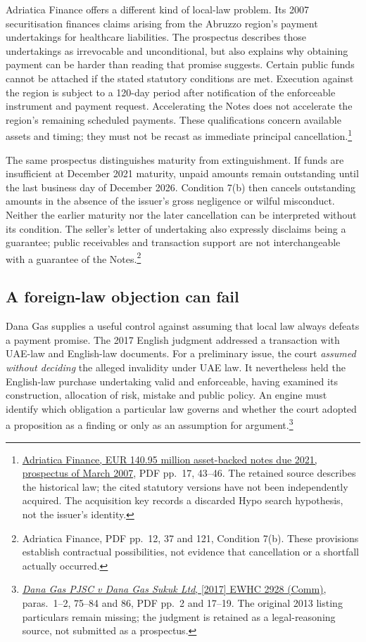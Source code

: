 Adriatica Finance offers a different kind of local-law problem. Its 2007
securitisation finances claims arising from the Abruzzo region's payment
undertakings for healthcare liabilities. The prospectus describes those
undertakings as irrevocable and unconditional, but also explains why
obtaining payment can be harder than reading that promise suggests.
Certain public funds cannot be attached if the stated statutory conditions
are met. Execution against the region is subject to a 120-day period after
notification of the enforceable instrument and payment request.
Accelerating the Notes does not accelerate the region's remaining scheduled
payments. These qualifications concern available assets and timing; they
must not be recast as immediate principal cancellation.\footnote{
\href{../prospectus/corner-cases-2026-10-04/sources/jur-more-hypo-843665/source.pdf}
{Adriatica Finance, EUR 140.95 million asset-backed notes due 2021,
prospectus of March 2007}, PDF pp.~17, 43--46.
The retained source describes the historical law; the cited statutory
versions have not been independently acquired. The acquisition key records
a discarded Hypo search hypothesis, not the issuer's identity.}

The same prospectus distinguishes maturity from extinguishment. If funds
are insufficient at December 2021 maturity, unpaid amounts remain outstanding
until the last business day of December 2026. Condition 7(b) then cancels
outstanding amounts in the absence of the issuer's gross negligence or
wilful misconduct. Neither the earlier maturity nor the later cancellation
can be interpreted without its condition. The seller's letter of undertaking
also expressly disclaims being a guarantee; public receivables and transaction
support are not interchangeable with a guarantee of the Notes.\footnote{
Adriatica Finance, PDF pp.~12, 37 and 121, Condition 7(b). These provisions
establish contractual possibilities, not evidence that cancellation or a
shortfall actually occurred.}

\subsection{A foreign-law objection can fail}

Dana Gas supplies a useful control against assuming that local law always
defeats a payment promise. The 2017 English judgment addressed a transaction
with UAE-law and English-law documents. For a preliminary issue, the court
\emph{assumed without deciding} the alleged invalidity under UAE law.
It nevertheless held the English-law purchase undertaking valid and
enforceable, having examined its construction, allocation of risk, mistake
and public policy. An engine must identify which obligation a particular law
governs and whether the court adopted a proposition as a finding or only
as an assumption for argument.\footnote{
\href{../prospectus/corner-cases-2026-10-04/sources/jur-more-dana-judgment/source.pdf}
{\emph{Dana Gas PJSC v Dana Gas Sukuk Ltd}, [2017] EWHC 2928 (Comm)},
paras.~1--2, 75--84 and 86, PDF pp.~2 and 17--19.
The original 2013 listing particulars remain missing; the judgment is
retained as a legal-reasoning source, not submitted as a prospectus.}

